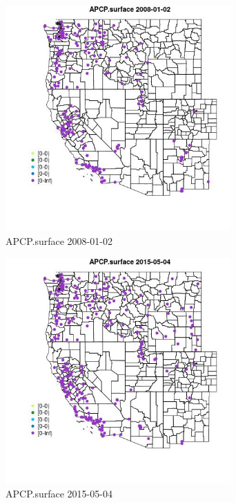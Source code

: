 \begin{figure} 
\centering  
\includegraphics[width=0.77\textwidth]{Code_Outputs/Report_ML_input_PM25_Step4_part_e_de_duplicated_aves_compiled_2019-05-18wNAs_MapObsAPCPsurface2008-01-02.jpg} 
\caption{\label{fig:Report_ML_input_PM25_Step4_part_e_de_duplicated_aves_compiled_2019-05-18wNAsMapObsAPCPsurface2008-01-02}APCP.surface 2008-01-02} 
\end{figure} 
 

\begin{figure} 
\centering  
\includegraphics[width=0.77\textwidth]{Code_Outputs/Report_ML_input_PM25_Step4_part_e_de_duplicated_aves_compiled_2019-05-18wNAs_MapObsAPCPsurface2015-05-04.jpg} 
\caption{\label{fig:Report_ML_input_PM25_Step4_part_e_de_duplicated_aves_compiled_2019-05-18wNAsMapObsAPCPsurface2015-05-04}APCP.surface 2015-05-04} 
\end{figure} 
 

